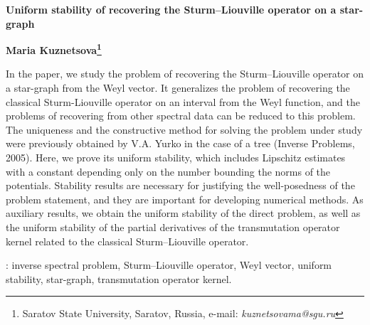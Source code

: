 \documentclass[a4paper, 12pt] {article}
\theoremstyle{plain}
\theoremstyle{remark}
\theoremstyle{plain}
\theoremstyle{definition}
\numberwithin{equation}{section}
\begin{document}
\begin{center}
{\bf\Large Uniform stability of recovering the Sturm--Liouville operator on a star-graph
}
\end{center}

\begin{center}
{\bf\large Maria Kuznetsova\footnote{Saratov State University, Saratov, Russia, e-mail: {\it kuznetsovama@sgu.ru}}}
\end{center}

 In the paper, we study the problem of recovering the Sturm--Liouville operator
on a star-graph from the Weyl vector. It generalizes the problem of recovering
the classical Sturm-Liouville operator on an interval from the Weyl function,
and the problems of recovering from other spectral data can be reduced to this
problem. The uniqueness and the constructive method for solving the problem
under study were previously obtained by V.A. Yurko in the case of a tree
(Inverse Problems, 2005). Here, we prove its uniform stability, which includes
Lipschitz estimates with a constant depending only on the number bounding the
norms of the potentials. Stability results are necessary for justifying the
well-posedness of the problem statement, and they are important for developing
numerical methods. As auxiliary results, we obtain the uniform stability of the
direct problem, as well as the uniform stability of the partial derivatives of
the transmutation operator kernel related to the classical Sturm--Liouville
operator.


\medskip
{}: inverse spectral problem, Sturm--Liouville operator, Weyl vector, uniform stability, star-graph, transmutation operator kernel.
\end{document}
